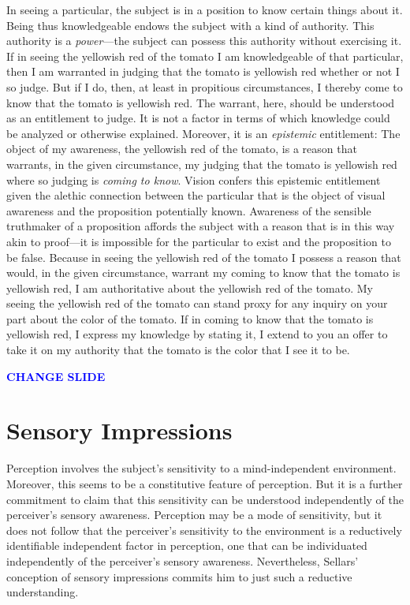 \documentclass[12pt]{article}
\newcommand{\change}{\textcolor{blue}{\textbf{CHANGE SLIDE}}}
\begin{document}
In seeing a particular, the subject is in a position to know certain things about it. Being thus knowledgeable endows the subject with a kind of authority. This authority is a \emph{power}---the subject can possess this authority without exercising it. If in seeing the yellowish red of the tomato I am knowledgeable of that particular, then I am warranted in judging that the tomato is yellowish red whether or not I so judge. But if I do, then, at least in propitious circumstances, I thereby come to know that the tomato is yellowish red. The warrant, here, should be understood as an entitlement to judge. It is not a factor in terms of which knowledge could be analyzed or otherwise explained. Moreover, it is an \emph{epistemic} entitlement: The object of my awareness, the yellowish red of the tomato, is a reason that warrants, in the given circumstance, my judging that the tomato is yellowish red where so judging is \emph{coming to know}. Vision confers this epistemic entitlement given the alethic connection between the particular that is the object of visual awareness and the proposition potentially known. Awareness of the sensible truthmaker of a proposition affords the subject with a reason that is in this way akin to proof---it is impossible for the particular to exist and the proposition to be false. Because in seeing the yellowish red of the tomato I possess a reason that would, in the given circumstance, warrant my coming to know that the tomato is yellowish red, I am authoritative about the yellowish red of the tomato. My seeing the yellowish red of the tomato can stand proxy for any inquiry on your part about the color of the tomato. If in coming to know that the tomato is yellowish red, I express my knowledge by stating it, I extend to you an offer to take it on my authority that the tomato is the color that I see it to be. 

\change


\section{Sensory Impressions} %
\label{sec:sensory_impressions}

Perception involves the subject's sensitivity to a mind-independent environment. Moreover, this seems to be a constitutive feature of perception. But it is a further commitment to claim that this sensitivity can be understood independently of the perceiver's sensory awareness. Perception may be a mode of sensitivity, but it does not follow that the perceiver's sensitivity to the environment is a reductively identifiable independent factor in perception, one that can be individuated independently of the perceiver's sensory awareness. Nevertheless, Sellars' conception of sensory impressions commits him to just such a reductive understanding.
\end{document}
